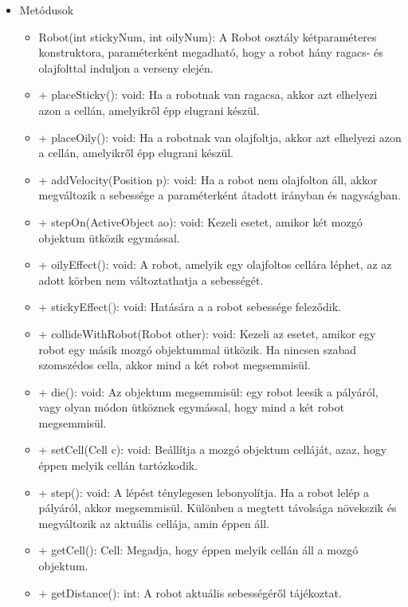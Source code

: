 \begin{itemize}
\begin{itemize}
	\end{itemize}
	\item Metódusok\newline
	\begin{itemize}
		\item Robot(int stickyNum, int oilyNum): A Robot osztály kétparaméteres konstruktora, paraméterként megadható, hogy a robot hány ragacs- és olajfolttal induljon a verseny elején.
		\item + placeSticky(): void: Ha a robotnak van ragacsa, akkor azt elhelyezi azon a cellán, amelyikről épp elugrani készül.
		\item + placeOily(): void: Ha a robotnak van olajfoltja, akkor azt elhelyezi azon a cellán, amelyikről épp elugrani készül.
		\item + addVelocity(Position p): void: Ha a robot nem olajfolton áll, akkor megváltozik a sebessége a paraméterként átadott irányban és nagyságban.
		\item + stepOn(ActiveObject ao): void: Kezeli esetet, amikor két mozgó objektum ütközik egymással.
		\item + oilyEffect(): void: A robot, amelyik egy olajfoltos cellára léphet, az az adott körben nem változtathatja a sebességét. 
		\item + stickyEffect(): void: Hatására a a robot sebessége feleződik. 
		\item + collideWithRobot(Robot other): void: Kezeli az esetet, amikor egy robot egy másik mozgó objektummal ütközik. Ha nincsen szabad szomszédos cella, akkor mind a két robot megsemmisül. 
		\item + die(): void: Az objektum megsemmisül: egy robot leesik a pályáról, vagy olyan módon ütköznek egymással, hogy mind a két robot megsemmisül. 
		\item + setCell(Cell c): void: Beállítja a mozgó objektum celláját, azaz, hogy éppen melyik cellán tartózkodik.
		\item + step(): void: A lépést ténylegesen lebonyolítja. Ha a robot lelép a pályáról, akkor megsemmisül. Különben a megtett távolsága növekszik és megváltozik az aktuális cellája, amin éppen áll.
		\item + getCell(): Cell: Megadja, hogy éppen melyik cellán áll a mozgó objektum.
		\item + getDistance(): int: A robot aktuális sebességéről tájékoztat. 
		
	\end{itemize}
\end{itemize}

